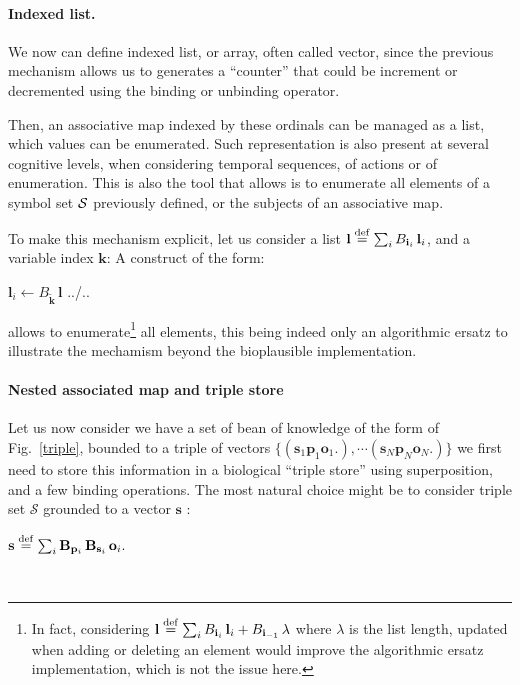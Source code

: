 \documentclass[a4]{article}
\newcommand{\deq}{\stackrel {\rm def}{=}}
\newcommand{\eqline}[1]{~\vspace{0.1cm}\\\centerline{$#1$}\vspace{0.1cm}\\}
\begin{document}
\paragraph{Indexed list.} We now can define indexed list, or array, often called vector, since the previous mechanism allows us to generates a ``counter'' that could be increment or decremented using the binding or unbinding operator.

Then, an associative map indexed by these ordinals can be managed as a list, which values can be enumerated. Such representation is also present at several cognitive levels, when considering temporal sequences, of actions or of enumeration. This is also the tool that allows is to enumerate all elements of a symbol set ${\cal S}$ previously defined, or the subjects of an associative map.

To make this mechanism explicit, let us consider a list $\mathbf{l} \deq \sum_i B_{\mathbf{i}_i} \, \mathbf{l}_i$, and a variable index $\mathbf{k}$: A construct of the form:
\begin{algorithmic}
   \State $\mathbf{l}_i \leftarrow B_{\tilde{\mathbf{k}}} \, \mathbf{l}$
   \State ../..
\EndFor   
\end{algorithmic}
allows to enumerate\footnote{In fact, considering $\mathbf{l} \deq \sum_i B_{\mathbf{i}_i} \, \mathbf{l}_i + B_{\mathbf{i}_{-1}} \, \lambda$ where $\lambda$ is the list length, updated when adding or deleting an element would improve the algorithmic ersatz implementation, which is not the issue here.} all elements, this being indeed only an algorithmic ersatz to illustrate the mechamism beyond the bioplausible implementation.

\paragraph{Nested associated map and triple store}

Let us now consider we have a set of bean of knowledge of the form of Fig.~\ref{triple}, bounded to a triple of vectors $\{(\mathbf{s}_1 \mathbf{p}_1 \mathbf{o}_1.), \cdots (\mathbf{s}_N \mathbf{p}_N \mathbf{o}_N.)\}$ we first need to store this information in a biological ``triple store'' using superposition, and a few binding operations. The most natural choice might be to consider triple set $\mathcal{S}$ grounded to a vector $\mathbf{s}$ :
\eqline{\mathbf{s} \deq \sum_i \mathbf{B}_{\mathbf{p}_i} \, \mathbf{B}_{\mathbf{s}_i} \, \mathbf{o}_i.}
\end{document}
